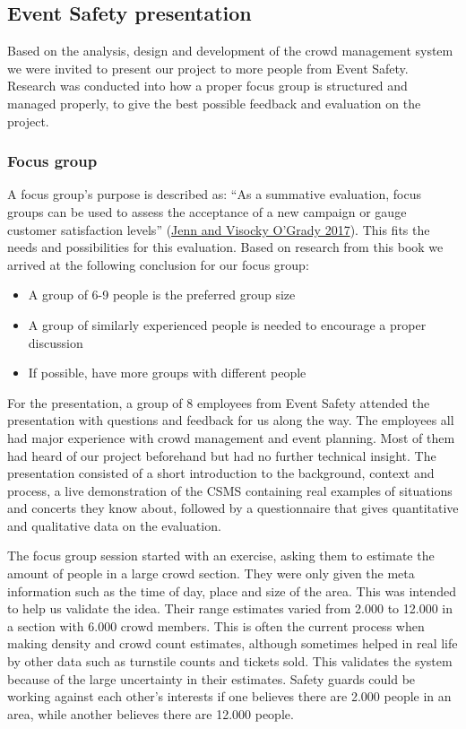 \documentclass[
]{article}
\providecommand{\tightlist}{%
  \setlength{\itemsep}{0pt}\setlength{\parskip}{0pt}}\usepackage{longtable,booktabs,array}
\begin{document}
\hypertarget{event-safety-presentation}{%
\subsection{Event Safety presentation}\label{event-safety-presentation}}

Based on the analysis, design and development of the crowd management
system we were invited to present our project to more people from Event
Safety. Research was conducted into how a proper focus group is
structured and managed properly, to give the best possible feedback and
evaluation on the project.

\hypertarget{sec-focusgroup}{%
\subsubsection{Focus group}\label{sec-focusgroup}}

A focus group's purpose is described as: ``As a summative evaluation,
focus groups can be used to assess the acceptance of a new campaign or
gauge customer satisfaction levels''
(\protect\hyperlink{ref-designers_research_manual}{Jenn and Visocky
O'Grady 2017}). This fits the needs and possibilities for this
evaluation. Based on research from this book we arrived at the following
conclusion for our focus group:

\begin{itemize}
\tightlist
\item
  A group of 6-9 people is the preferred group size
\item
  A group of similarly experienced people is needed to encourage a
  proper discussion
\item
  If possible, have more groups with different people
\end{itemize}

For the presentation, a group of 8 employees from Event Safety attended
the presentation with questions and feedback for us along the way. The
employees all had major experience with crowd management and event
planning. Most of them had heard of our project beforehand but had no
further technical insight. The presentation consisted of a short
introduction to the background, context and process, a live
demonstration of the CSMS containing real examples of situations and
concerts they know about, followed by a questionnaire that gives
quantitative and qualitative data on the evaluation.

The focus group session started with an exercise, asking them to
estimate the amount of people in a large crowd section. They were only
given the meta information such as the time of day, place and size of
the area. This was intended to help us validate the idea. Their range
estimates varied from 2.000 to 12.000 in a section with 6.000 crowd
members. This is often the current process when making density and crowd
count estimates, although sometimes helped in real life by other data
such as turnstile counts and tickets sold. This validates the system
because of the large uncertainty in their estimates. Safety guards could
be working against each other's interests if one believes there are
2.000 people in an area, while another believes there are 12.000 people.
\end{document}
